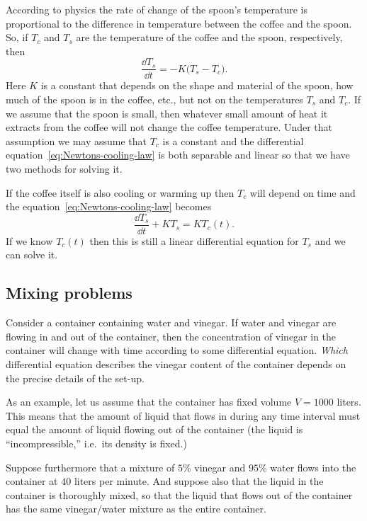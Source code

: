 According to physics the rate of change of the spoon's temperature is proportional to
the difference in temperature between the coffee and the spoon.  So, if $T_c$ and
$T_s$ are the temperature of the coffee and the spoon, respectively, then
\begin{equation}
  \frac{\dd T_s} {\dd t} = -K\bigl(T_s - T_c\bigr).
  \label{eq:Newtons-cooling-law}
\end{equation}
Here $K$ is a constant that depends on the shape and material of the spoon, how much
of the spoon is in the coffee, etc., but not on the temperatures $T_s$ and $T_c$.  If
we assume that the spoon is small, then whatever small amount of heat it extracts
from the coffee will not change the coffee temperature.  Under that assumption we may
assume that $T_c$ is a constant and the differential
equation~\eqref{eq:Newtons-cooling-law} is both separable and linear so that we have
two methods for solving it.

If the coffee itself is also cooling or warming up then $T_c$ will depend on time and
the equation~\eqref{eq:Newtons-cooling-law} becomes
\begin{equation}
  \label{eq:Newton-cooling-nonautonomous}
  \frac{\dd T_s} {\dd t} +K T_s = KT_c(t).
\end{equation}
If we know $T_c(t)$ then this is still a linear differential equation for $T_s$ and
we can solve it.

\subsection{Mixing problems} %
Consider a container containing water and vinegar.  If
water and vinegar are flowing in and out of the container, then the concentration of
vinegar in the container will change with time according to some differential
equation.  \textit{Which} differential equation describes the vinegar content of the
container depends on the precise details of the set-up.

As an example, let us assume that the container has fixed volume $V = 1000$ liters.
This means that the amount of liquid that flows in during any time interval must equal
the amount of liquid flowing out of the container (the liquid is ``incompressible,''
i.e.~its density is fixed.)

Suppose furthermore that a mixture of $5$\% vinegar and $95$\% water flows into the
container at $40$ liters per minute. And suppose also that the liquid in the
container is thoroughly mixed, so that the liquid that flows out of the container has
the same vinegar/water mixture as the entire container.

